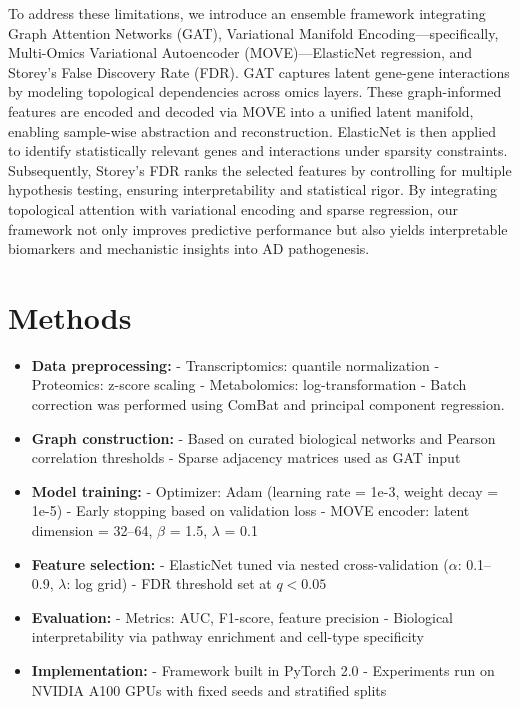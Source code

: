 \documentclass[12pt]{article}
\begin{document}
To address these limitations, we introduce an ensemble framework integrating Graph Attention Networks (GAT), Variational Manifold Encoding—specifically, Multi-Omics Variational Autoencoder (MOVE)—ElasticNet regression, and Storey's False Discovery Rate (FDR). GAT captures latent gene-gene interactions by modeling topological dependencies across omics layers. These graph-informed features are encoded and decoded via MOVE into a unified latent manifold, enabling sample-wise abstraction and reconstruction. ElasticNet is then applied to identify statistically relevant genes and interactions under sparsity constraints. Subsequently, Storey's FDR ranks the selected features by controlling for multiple hypothesis testing, ensuring interpretability and statistical rigor. By integrating topological attention with variational encoding and sparse regression, our framework not only improves predictive performance but also yields interpretable biomarkers and mechanistic insights into AD pathogenesis.

\section{Methods}

\begin{itemize}
  \item \textbf{Data preprocessing:} 
    - Transcriptomics: quantile normalization  
    - Proteomics: z-score scaling  
    - Metabolomics: log-transformation  
    - Batch correction was performed using ComBat and principal component regression.

  \item \textbf{Graph construction:} 
    - Based on curated biological networks and Pearson correlation thresholds  
    - Sparse adjacency matrices used as GAT input

  \item \textbf{Model training:} 
    - Optimizer: Adam (learning rate = 1e-3, weight decay = 1e-5)  
    - Early stopping based on validation loss  
    - MOVE encoder: latent dimension = 32–64, $\beta$ = 1.5, $\lambda$ = 0.1

  \item \textbf{Feature selection:} 
    - ElasticNet tuned via nested cross-validation ($\alpha$: 0.1–0.9, $\lambda$: log grid)  
    - FDR threshold set at $q < 0.05$

  \item \textbf{Evaluation:} 
    - Metrics: AUC, F1-score, feature precision  
    - Biological interpretability via pathway enrichment and cell-type specificity

  \item \textbf{Implementation:} 
    - Framework built in PyTorch 2.0  
    - Experiments run on NVIDIA A100 GPUs with fixed seeds and stratified splits
\end{itemize}
\end{document}
